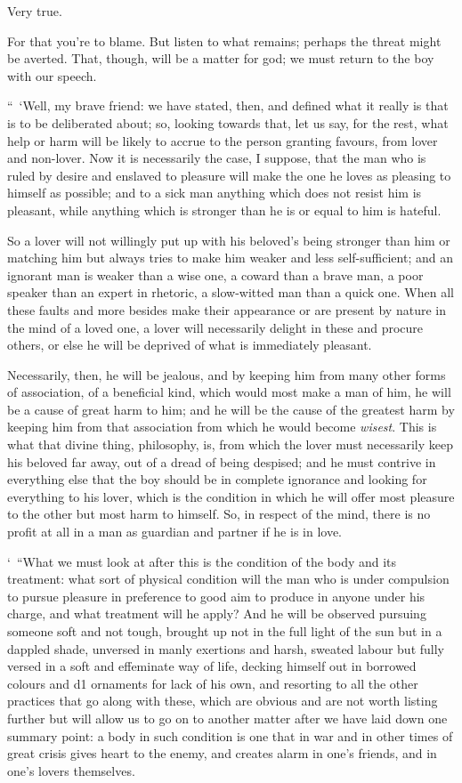 Very true.

 For that you're to blame. But listen to what remains;
perhaps the threat might be averted. That, though, will be a matter for
god; we must return to the boy with our speech.

“~‘Well, my brave friend:
we have stated, then, and defined what it really is that is to be
deliberated about; so, looking towards that, let us say, for the rest,
what help or harm will be  likely to accrue to the person
granting favours, from lover and non-lover. Now it is
necessarily the case, I
suppose, that the man who is ruled by desire and enslaved to pleasure
will make the one he loves as pleasing to himself as possible; and to a
sick man anything which does not resist him is pleasant, while 
anything which is stronger than he is or equal to him is hateful.

So a lover will not willingly put up with his beloved's being 
stronger than him or matching him but always tries to make him weaker
and less self-sufficient; and an ignorant man is weaker than a wise one,
a coward than a brave man, a poor speaker than an expert in rhetoric, a
slow-witted man than a quick one. When all these faults and more besides
make their  appearance or are present by nature in the mind of a
loved one, a lover will necessarily delight in these and procure others,
or else he will be deprived of what is immediately pleasant.

Necessarily, then, he will be jealous, and by keeping him from 
many other forms of association, of a beneficial kind, which would most
make a man of him, he will be a cause of great harm to him; and he will
be the cause of the greatest harm by keeping him from that association
from which he would become
{\em wisest}. This is
what that divine thing, philosophy, is, from which the lover must
necessarily keep his beloved far  away, out of a dread of being
despised; and he must contrive in everything else that the boy should be
in complete ignorance and looking for everything to his lover, which is
the condition in which he will offer most pleasure to the other but most
harm to himself. So, in respect of the mind, there is no profit at all
in  a man as guardian and partner if he is in love.

‘~“What we must look at after this is the condition of the body and its
treatment: what sort of physical condition will the man who is under
compulsion to pursue pleasure in preference to good aim to produce in
anyone under his charge, and what  treatment will he apply? And
he will be observed pursuing someone soft and not tough, brought up not
in the full light of the sun but in a dappled shade, unversed in manly
exertions and harsh, sweated labour but fully versed in a soft and
effeminate way of life, decking himself out in borrowed colours and d1
ornaments for lack of his own, and resorting to all the other practices
that go along with these, which are obvious and are not worth listing
further but will allow us to go on to another matter after we have laid
down one summary point: a body in  such condition is one that in
war and in other times of great crisis gives heart to the enemy, and
creates alarm in one's friends, and in one's lovers themselves.


